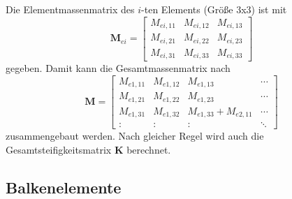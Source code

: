 \documentclass[a4paper,10pt,twoside]{article}
\numberwithin{equation}{section} %
\numberwithin{figure}{section}   %
\numberwithin{table}{section}    %
\begin{document}
	Die Elementmassenmatrix des $i$-ten Elements (Größe 3x3) ist mit
	\begin{equation}\label{equ:qudra-Kei-matrix}
	\mathbf{M}_{ei} =
	\left[ 
	\begin{array}{ccc}
	M_{ei,11} & M_{ei,12} & M_{ei,13} \\
	M_{ei,21} & M_{ei,22} & M_{ei,23} \\
	M_{ei,31} & M_{ei,33} & M_{ei,33} 
	\end{array} 
	\right] 
	\end{equation}
	gegeben. Damit kann die Gesamtmassenmatrix nach
	\begin{equation}\label{equ:qudra-K-matrxi}
	\mathbf{M} = 
	\left[ 
	\begin{array}{cccc}
	M_{e1,11} & M_{e1,12} & M_{e1,13}           & \cdots \\
	M_{e1,21} & M_{e1,22} & M_{e1,23}           & \cdots \\
	M_{e1,31} & M_{e1,32} & M_{e1,33}+M_{e2,11} & \cdots \\
	\colon    & \colon    & \colon              & \ddots 
	\end{array}
	\right] 
	\end{equation}
	zusammengebaut werden. Nach gleicher Regel wird auch die Gesamtsteifigkeitsmatrix $ \mathbf{K} $ berechnet.
	
	\subsection{Balkenelemente} \label{sec:biegeschwingung-von-balken}
	
\end{document}
